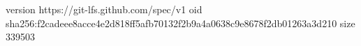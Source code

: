version https://git-lfs.github.com/spec/v1
oid sha256:f2cadeee8acce4e2d818ff5afb70132f2b9a4a0638c9e8678f2db01263a3d210
size 339503
